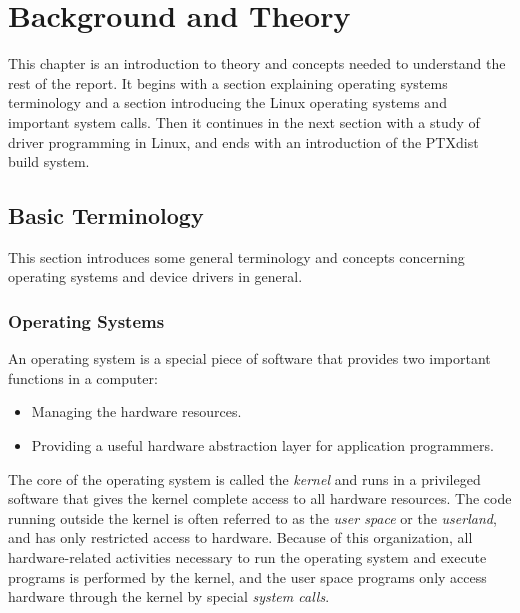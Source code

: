 \chapter{Background and Theory}

This chapter is an introduction to theory and concepts needed to understand the rest of the report. It begins with a section explaining operating systems terminology and a section introducing the Linux operating systems and important system calls. Then it continues in the next section with a study of driver programming in Linux, and ends with an introduction of the PTXdist build system.


\section{Basic Terminology}
This section introduces some general terminology and concepts concerning operating systems and device drivers in general.

\subsection{Operating Systems}
An operating system is a special piece of software that provides two important functions in a computer:
\begin{itemize}
  \item Managing the hardware resources.
  \item Providing a useful hardware abstraction layer for application programmers.
\end{itemize}
The core of the operating system is called the \emph{kernel} and runs in a privileged software that gives the kernel complete access to all hardware resources. The code running outside the kernel is often referred to as the \emph{user space} or the \emph{userland}, and has only restricted access to hardware. Because of this organization, all hardware-related activities necessary to run the operating system and execute programs is performed by the kernel, and the user space programs only access hardware through the kernel by special \emph{system calls}.
\cite{modern-operating-systems}

